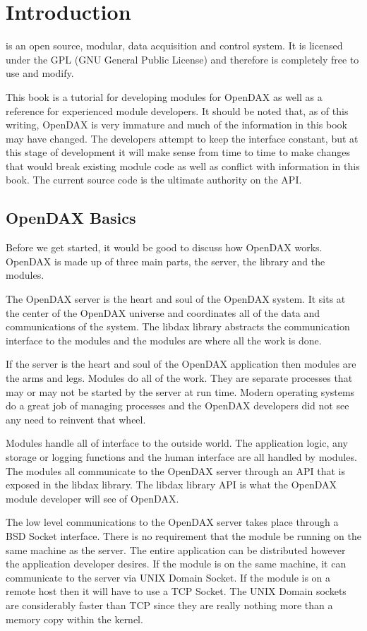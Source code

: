 \chapter{Introduction}
\opendax is an open source, modular, data acquisition and control system. It is licensed under the GPL (GNU General Public License) and therefore is completely free to use and modify.

This book is a tutorial for developing modules for OpenDAX as well as a reference for experienced module developers.  It should be noted that, as of this writing, OpenDAX is very immature and much of the information in this book may have changed.  The developers attempt to keep the interface constant, but at this stage of development it will make sense from time to time to make changes that would break existing module code as well as conflict with information in this book.  The current source code is the ultimate authority on the API.

\section{OpenDAX Basics}
Before we get started, it would be good to discuss how OpenDAX works.  OpenDAX is made up of three main parts, the server, the library and the modules.

The OpenDAX server is the heart and soul of the OpenDAX system.  It sits at the center of the OpenDAX universe and coordinates all of the data and communications of the system.  The libdax library abstracts the communication interface to the modules and the modules are where all the work is done.

If the server is the heart and soul of the OpenDAX application then modules are the arms and legs.  Modules do all of the work.  They are separate processes that may or may not be started by the server at run time.  Modern operating systems do a great job of managing processes and the OpenDAX developers did not see any need to reinvent that wheel.  

Modules handle all of interface to the outside world.  The application logic, any storage or logging functions and the human interface are all handled by modules.  The modules all communicate to the OpenDAX server through an API that is exposed in the libdax library.  The libdax library API is what the OpenDAX module developer will see of OpenDAX.

The low level communications to the OpenDAX server takes place through a BSD Socket interface.  There is no requirement that the module be running on the same machine as the server.  The entire application can be distributed however the application developer desires.  If the module is on the same machine, it can communicate to the server via UNIX Domain Socket.  If the module is on a remote host then it will have to use a TCP Socket.  The UNIX Domain sockets are considerably faster than TCP since they are really nothing more than a memory copy within the kernel.

